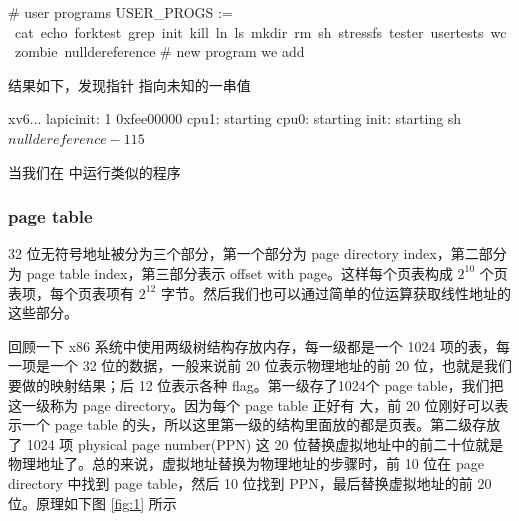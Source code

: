 \begin{bashcode}
    # user programs
    USER_PROGS := \
    cat\
    echo\
    forktest\
    grep\
    init\
    kill\
    ln\
    ls\
    mkdir\
    rm\
    sh\
    stressfs\
    tester\
    usertests\
    wc\
    zombie\
    nulldereference # new program we add
\end{bashcode}

结果如下，发现指针  指向未知的一串值

\begin{textcode}
    xv6...
    lapicinit: 1 0xfee00000
    cpu1: starting
    cpu0: starting
    init: starting sh
    $ nulldereference
    -115
    $ 
\end{textcode}

当我们在  中运行类似的程序


\subsubsection{page table}

32 位无符号地址被分为三个部分，第一个部分为 page directory index，第二部分为 page table index，第三部分表示 offset with page。这样每个页表构成 $2^{10}$ 个页表项，每个页表项有 $2^{12}$ 字节。然后我们也可以通过简单的位运算获取线性地址的这些部分。

回顾一下 x86 系统中使用两级树结构存放内存，每一级都是一个 1024 项的表，每一项是一个 32 位的数据，一般来说前 20 位表示物理地址的前 20 位，也就是我们要做的映射结果；后 12 位表示各种 flag。第一级存了1024个 page table，我们把这一级称为 page directory。因为每个 page table 正好有  大，前 20 位刚好可以表示一个 page table 的头，所以这里第一级的结构里面放的都是页表。第二级存放了 1024 项 physical page number(PPN) 这 20 位替换虚拟地址中的前二十位就是物理地址了。总的来说，虚拟地址替换为物理地址的步骤时，前 10 位在 page directory 中找到 page table，然后 10 位找到 PPN，最后替换虚拟地址的前 20 位。原理如下图 \ref{fig:1} 所示

